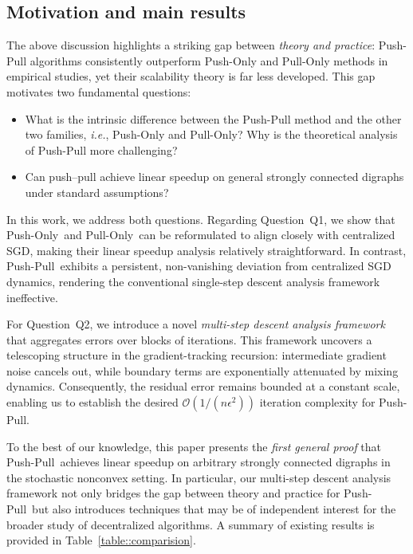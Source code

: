 \documentclass[10pt]{article}
\newcommand{\pushonly}{{\sc Push-Only}\xspace}
\newcommand{\pushpull}{{\sc Push-Pull}\xspace}
\newcommand{\pullonly}{{\sc Pull-Only}\xspace}
\newcommand{\ie}{{\em i.e.\xspace}}
\begin{document}
\subsection{Motivation and main results} The above discussion highlights a striking gap between \emph{theory and practice}: \pushpull algorithms consistently outperform \pushonly and \pullonly methods in empirical studies, yet their scalability theory is far less developed. This gap motivates two fundamental questions:  

\vspace{2mm}
\begin{itemize}
\item[Q1.] {What is the intrinsic difference between the \pushpull method and the other two families, \ie, \pushonly and \pullonly? Why is the theoretical analysis of \pushpull more challenging?}

\vspace{1mm}
\item[Q2.] Can push--pull achieve linear speedup on general strongly connected digraphs under standard assumptions?  
\end{itemize}

\vspace{2mm}
In this work, we address both questions. Regarding Question~Q1, we show that \pushonly\ and \pullonly\ can be reformulated to align closely with centralized SGD, making their linear speedup analysis relatively straightforward. In contrast, \pushpull\ exhibits a persistent, non-vanishing deviation from centralized SGD dynamics, rendering the conventional single-step descent analysis framework ineffective.  

For Question~Q2, we introduce a novel \emph{multi-step descent analysis framework} that aggregates errors over blocks of iterations. This framework uncovers a telescoping structure in the gradient-tracking recursion: intermediate gradient noise cancels out, while boundary terms are exponentially attenuated by mixing dynamics. Consequently, the residual error remains bounded at a constant scale, enabling us to establish the desired $\mathcal{O}(1/(n\epsilon^2))$ iteration complexity for \pushpull.  

To the best of our knowledge, this paper presents the \emph{first general proof} that \pushpull\ achieves linear speedup on arbitrary strongly connected digraphs in the stochastic nonconvex setting. In particular, our multi-step descent analysis framework not only bridges the gap between theory and practice for \pushpull\ but also introduces techniques that may be of independent interest for the broader study of decentralized algorithms. A summary of existing results is provided in Table~\ref{table::comparision}.  
\end{document}
